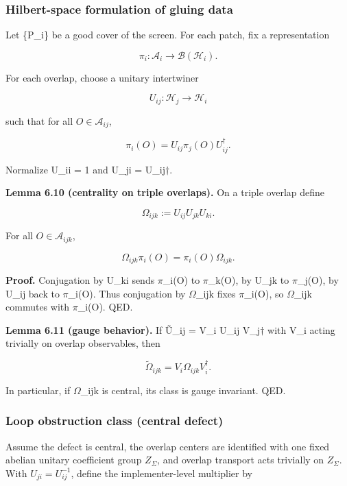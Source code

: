 \subsubsection{Hilbert-space formulation of gluing data}\label{65-hilbert-space-formulation-of-gluing-data}

Let \{P\_i\} be a good cover of the screen. For each patch, fix a representation

\[
\pi_i: \mathcal{A}_i \to \mathcal B(\mathcal H_i).
\]

For each overlap, choose a unitary intertwiner

\[
U_{ij}: \mathcal H_j \to \mathcal H_i
\]

such that for all \(O \in \mathcal{A}_{ij}\),

\[
\pi_i(O) = U_{ij} \pi_j(O) U_{ij}^\dagger.
\]

Normalize U\_ii = 1 and U\_ji = U\_ij\ensuremath{\dagger}.

\textbf{Lemma 6.10 (centrality on triple overlaps).} On a triple overlap define

\[
\Omega_{ijk} := U_{ij} U_{jk} U_{ki}.
\]

For all \(O \in \mathcal{A}_{ijk}\),

\[
\Omega_{ijk} \pi_i(O) = \pi_i(O) \Omega_{ijk}.
\]

\textbf{Proof.} Conjugation by U\_ki sends \ensuremath{\pi}\_i(O) to \ensuremath{\pi}\_k(O), by U\_jk to \ensuremath{\pi}\_j(O), by U\_ij back to \ensuremath{\pi}\_i(O). Thus conjugation by \ensuremath{\Omega}\_ijk fixes \ensuremath{\pi}\_i(O), so \ensuremath{\Omega}\_ijk commutes with \ensuremath{\pi}\_i(O). QED.

\textbf{Lemma 6.11 (gauge behavior).} If \~{U}\_ij = V\_i U\_ij V\_j\ensuremath{\dagger} with V\_i acting trivially on overlap observables, then

\[
\tilde{\Omega}_{ijk} = V_i \Omega_{ijk} V_i^\dagger.
\]

In particular, if \ensuremath{\Omega}\_ijk is central, its class is gauge invariant. QED.

\subsubsection{Loop obstruction class (central defect)}\label{66-loop-obstruction-class-central-defect}

Assume the defect is central, the overlap centers are identified with one fixed abelian unitary
coefficient group \(Z_\Sigma\), and overlap transport acts trivially on \(Z_\Sigma\). With
\(U_{ji}=U_{ij}^{-1}\), define the implementer-level multiplier by

